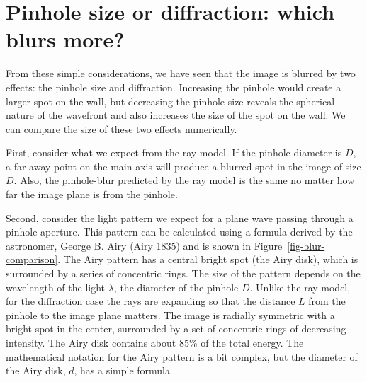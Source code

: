 \documentclass[
  letterpaper,
]{book}
\begin{document}
\section{Pinhole size or diffraction: which blurs
more?}\label{sec-airy-pattern}

From these simple considerations, we have seen that the image is blurred
by two effects: the pinhole size and diffraction. Increasing the pinhole
would create a larger spot on the wall, but decreasing the pinhole size
reveals the spherical nature of the wavefront and also increases the
size of the spot on the wall. We can compare the size of these two
effects numerically.

\begin{figure}



\end{figure}%

First, consider what we expect from the ray model. If the pinhole
diameter is \(D\), a far-away point on the main axis will produce a
blurred spot in the image of size \(D\). Also, the pinhole-blur
predicted by the ray model is the same no matter how far the image plane
is from the pinhole.

Second, consider the light pattern we expect for a plane wave passing
through a pinhole aperture. This pattern can be calculated using a
formula derived by the astronomer, George B. Airy (Airy 1835) and is
shown in Figure~\ref{fig-blur-comparison}. The Airy pattern has a
central bright spot (the Airy disk), which is surrounded by a series of
concentric rings. The size of the pattern depends on the wavelength of
the light \(\lambda\), the diameter of the pinhole \(D\). Unlike the ray
model, for the diffraction case the rays are expanding so that the
distance \(L\) from the pinhole to the image plane matters. The image is
radially symmetric with a bright spot in the center, surrounded by a set
of concentric rings of decreasing intensity. The Airy disk contains
about 85\% of the total energy. The mathematical notation for the Airy
pattern is a bit complex, but the diameter of the Airy disk, \(d\), has
a simple formula
\end{document}
